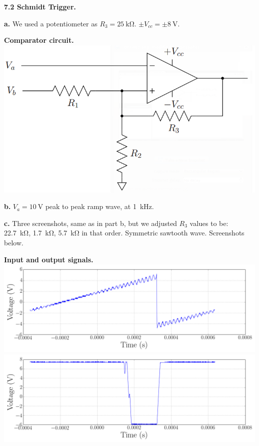 \documentclass{article}
\newenvironment{2colfig}{
  \par\medskip\noindent\minipage{\linewidth}
} {
  \endminipage\par\medskip
}
\newcommand{\labhead}[1]{
  \vspace{1em}
  {\bf #1}$_{\,}$
  \hline
  \vspace{1em}
}
\begin{document}
\begin{multicols*}{2}
\labhead{7.2 Schmidt Trigger.}
{\bf a.} We used a potentiometer as $R_3 = \SI{25}{\kilo\ohm}$. $\pm V_{cc} = \pm \SI{8}{\volt}$.

\begin{2colfig}
  \center
  {\bf Comparator circuit.} \newline
  \includegraphics[scale=.4]{circuit2}
  \label{fig:circ2}
\end{2colfig}

{\bf b.} $V_a = \SI{10}{\volt}$ peak to peak ramp wave, at \SI{1}{\kilo\hertz}.
\newline

{\bf c.} Three screenshots, same as in part b, but we adjusted $R_3$ values to be: \SI{22.7}{\kilo\ohm}, \SI{1.7}{\kilo\ohm}, \SI{5.7}{\kilo\ohm} in that order. Symmetric sawtooth wave. Screenshots below.
\newline

\begin{2colfig}
  \center
  {\bf Input and output signals.} \newline
  \includegraphics[scale=.22]{day1_lab8/ALL0003/F0003CH1}
  \includegraphics[scale=.22]{day1_lab8/ALL0003/F0003CH2}
  \label{fig:plot4}
\end{2colfig}


\end{multicols*}
\end{document}
